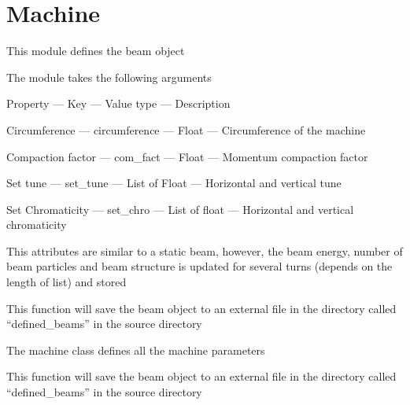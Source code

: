\documentclass[letterpaper,10pt,english]{sphinxmanual}
\begin{document}
\section{Machine}
\label{machine:machine}\label{machine::doc}\label{machine:module-machine}
This module defines the beam object

The module takes the following arguments

Property --- Key --- Value type --- Description

Circumference --- circumference --- Float --- Circumference of the machine

Compaction factor --- com\_fact --- Float --- Momentum compaction factor

Set tune --- set\_tune --- List of Float --- Horizontal and vertical tune

Set Chromaticity --- set\_chro --- List of float --- Horizontal and vertical chromaticity

\begin{fulllineitems}
\label{machine:machine.dynamicmachine}
This attributes are similar to a static beam, however, the beam energy, number of beam particles and beam structure is updated for several turns (depends on the length of list) and stored

\begin{fulllineitems}
\label{machine:machine.dynamicmachine.save}
This function will save the beam object to an external file in the directory called ``defined\_beams'' in the source directory

\end{fulllineitems}


\end{fulllineitems}


\begin{fulllineitems}
\label{machine:machine.staticmachine}
The machine class defines all the machine parameters

\begin{fulllineitems}
\label{machine:machine.staticmachine.save}
This function will save the beam object to an external file in the directory called ``defined\_beams'' in the source directory

\end{fulllineitems}


\end{fulllineitems}
\end{document}

